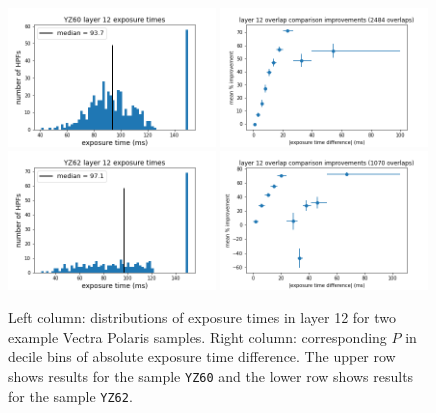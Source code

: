 \documentclass[letterpaper,11pt]{article}
\begin{document}
\begin{figure}[!ht]
\centering
\includegraphics[width=0.49\textwidth]{images/results/exposure_times_layer_12_YZ60}
\includegraphics[width=0.49\textwidth]{images/results/layer_12_improvements_YZ60}
\includegraphics[width=0.49\textwidth]{images/results/exposure_times_layer_12_YZ62}
\includegraphics[width=0.49\textwidth]{images/results/layer_12_improvements_YZ62}
\caption{\footnotesize Left column: distributions of exposure times in layer 12 for two example Vectra Polaris samples. Right column: corresponding $P$ in decile bins of absolute exposure time difference. The upper row shows results for the sample \texttt{YZ60} and the lower row shows results for the sample \texttt{YZ62}.}
\label{fig:polaris_exposure_time_improvement_cases}
\end{figure}
\end{document}

